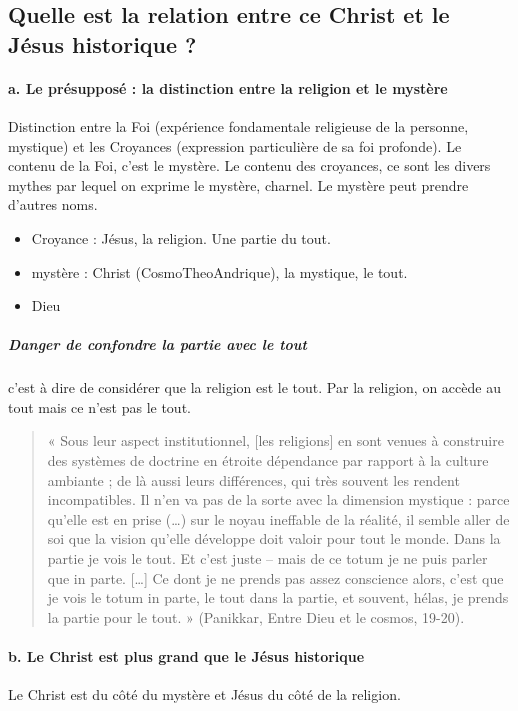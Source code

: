 \subsection{Quelle est la relation entre ce Christ et le Jésus historique ?}

 

\paragraph{a. Le présupposé : la distinction entre la religion et le mystère} Distinction entre la Foi (expérience fondamentale religieuse de la personne, mystique) et les Croyances (expression particulière de sa foi profonde).
Le contenu de la Foi, c'est le mystère. Le contenu des croyances, ce sont les divers mythes par lequel on exprime le mystère, charnel. Le mystère peut prendre d'autres noms.

\begin{itemize}
    \item Croyance : Jésus, la religion. Une partie du tout. 
    \item mystère : Christ (CosmoTheoAndrique), la mystique, le tout.
    \item Dieu
\end{itemize}

\subparagraph{Danger de confondre la partie avec le tout} c'est à dire de considérer que la religion est le tout. Par la religion, on accède au tout mais ce n'est pas le tout. 


\begin{quote}
    
« Sous leur aspect institutionnel, [les religions] en sont venues à construire des systèmes de 
doctrine en étroite dépendance par rapport à la culture ambiante ; de là aussi leurs différences, 
qui très souvent les rendent incompatibles. Il n’en va pas de la sorte avec la dimension mystique : 
parce qu’elle est en prise (…) sur le noyau ineffable de la réalité, il semble aller de soi que la 
vision qu’elle développe doit valoir pour tout le monde. Dans la partie je vois le tout. Et c’est 
juste – mais de ce totum je ne puis parler que in parte. […] Ce dont je ne prends pas assez 
conscience alors, c’est que je vois le totum in parte, le tout dans la partie, et souvent, hélas, 
je prends la partie pour le tout. » (Panikkar, Entre Dieu et le cosmos, 19-20).

\end{quote}


\paragraph{b. Le Christ est plus grand que le Jésus historique} Le Christ est du côté du mystère et Jésus du côté de la religion. 


